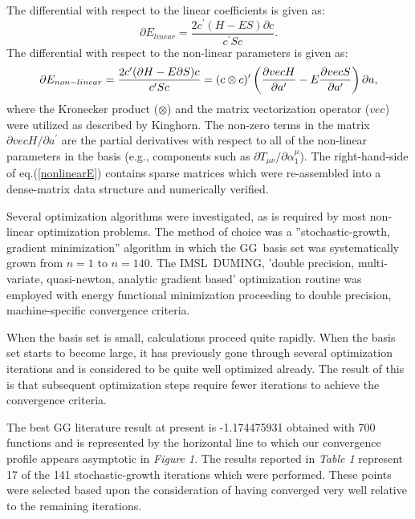 The differential with respect to the linear coefficients is given as: 
\begin{equation}
\partial E_{linear}=\frac{2c^{\prime }(H-ES)\partial c}{c^{\prime }Sc}.
\end{equation}
The differential with respect to the non-linear parameters is given as: 
\begin{equation}
\partial E_{non-linear}=\frac{2c^{\prime }(\partial H-E\partial S)c}{%
c^{\prime }Sc}=(c\otimes c)^{\prime }\left( \frac{\partial vecH}{\partial
a^{\prime }}-E\frac{\partial vecS}{\partial a^{\prime }}\right) \partial a,
\label{nonlinearE}
\end{equation}
where the Kronecker product ($\otimes $) and the matrix vectorization
operator ($vec$) were utilized as described by Kinghorn\cite{kinghorn2}. The
non-zero terms in the matrix $\partial vecH/\partial a^{\prime }$ are the
partial derivatives with respect to all of the non-linear parameters in the
basis (e.g., components such as $\partial T_{\mu \nu }/\partial \alpha
_1^\mu $). The right-hand-side of eq.(\ref{nonlinearE}) contains sparse
matrices which were re-assembled into a dense-matrix data structure\cite
{kinghorn1} and numerically verified.

Several optimization algorithms were investigated, as is required by most
non-linear optimization problems. The method of choice was a
''stochastic-growth, gradient minimization'' algorithm\cite{gilmore1} in
which the GG\ basis set was systematically grown from $n=1$ to $n=140$. The
IMSL\ DUMING, 'double precision, multi-variate, quasi-newton, analytic
gradient based' optimization routine was employed with energy functional
minimization proceeding to double precision, machine-specific convergence
criteria.

When the basis set is small, calculations proceed quite rapidly. When the
basis set starts to become large, it has previously gone through several
optimization iterations and is considered to be quite well optimized
already. The result of this is that subsequent optimization steps require
fewer iterations to achieve the convergence criteria.

\medskip \medskip 

The best GG literature result at present is -1.174475931 obtained with 700
functions\cite{rych1} and is represented by the horizontal line to which our
convergence profile appears asymptotic in {\it Figure 1}. The results
reported in {\it Table 1} represent 17 of the 141 stochastic-growth
iterations which were performed. These points were selected based upon the
consideration of having converged very well relative to the remaining
iterations.

